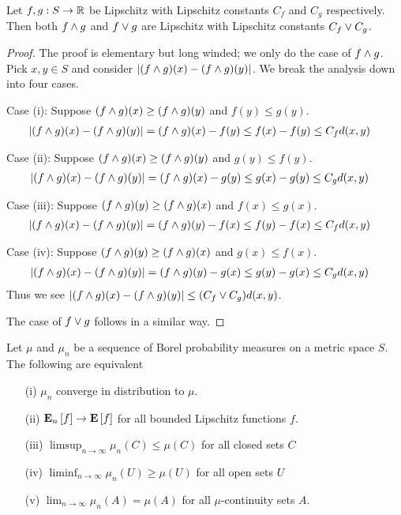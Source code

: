 \begin{lem}\label{MaxMinOfLipschitz}Let $f,g : S \to \reals$ be Lipschitz with Lipschitz
  constants $C_f$ and $C_g$ respectively.  Then both $f \minop g$
  and $f \maxop g$ are Lipschitz with Lipschitz constants $C_f \maxop C_g$.
\end{lem}
\begin{proof}
The proof is elementary but long winded; we only do the case of $f
\minop g$.  Pick $x,y \in S$ and
consider $\abs{(f \minop g)(x) - (f \minop g)(y)}$.  We break the analysis
down into four cases.  

Case (i): Suppose $(f \minop g)(x) \geq (f \minop g)(y)$ and $f(y) \leq g(y)$.
\begin{align*}
\abs{(f \minop g)(x) - (f \minop g)(y)} &= (f \minop g)(x) - f(y) \leq
f(x) - f(y) \leq C_f d(x,y)
\end{align*}

Case (ii): Suppose $(f \minop g)(x) \geq (f \minop g)(y)$ and $g(y) \leq f(y)$.
\begin{align*}
\abs{(f \minop g)(x) - (f \minop g)(y)} &= (f \minop g)(x) - g(y) \leq
g(x) - g(y) \leq C_g d(x,y)
\end{align*}

Case (iii): Suppose $(f \minop g)(y) \geq (f \minop g)(x)$ and $f(x) \leq g(x)$.
\begin{align*}
\abs{(f \minop g)(x) - (f \minop g)(y)} &= (f \minop g)(y) - f(x) \leq
f(y) - f(x) \leq C_f d(x,y)
\end{align*}

Case (iv): Suppose $(f \minop g)(y) \geq (f \minop g)(x)$ and $g(x) \leq f(x)$.
\begin{align*}
\abs{(f \minop g)(x) - (f \minop g)(y)} &= (f \minop g)(y) - g(x) \leq
g(y) - g(x) \leq C_g d(x,y)
\end{align*}
Thus we see $\abs{(f \minop g)(x) - (f \minop g)(y)} \leq (C_f \vee
C_g) d(x,y)$.

The case of $f \maxop g$ follows in a similar way.
\end{proof}

\begin{thm}\label{PortmanteauTheorem}Let $\mu$ and $\mu_n$ be a sequence of
 Borel probability measures on a metric space $S$.  The following are equivalent
\begin{itemize}
\item[(i)] $\mu_n$ converge in distribution to $\mu$.
\item[(ii)] $\sexpectation{f}{n} \to \expectation{f}$
  for all bounded Lipschitz functions $f$.
\item[(iii)] $\limsup_{n \to \infty} \mu_n(C) \leq
  \mu(C)$ for all closed sets $C$
\item[(iv)] $\liminf_{n \to \infty} \mu_n(U) \geq
  \mu(U)$ for all open sets $U$
\item[(v)] $\lim_{n \to \infty} \mu_n(A) = \mu(A)$ for all
  $\mu$-continuity sets $A$.
\end{itemize}
\end{thm}

